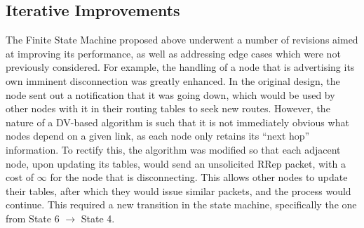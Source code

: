 \subsection{Iterative Improvements}\label{subsec:SMiterativeImprovements}
The Finite State Machine proposed above underwent a number of revisions aimed at improving its performance, as well as addressing edge cases which were not previously considered. For example, the handling of a node that is advertising its own imminent disconnection was greatly enhanced. In the original design, the node sent out a notification that it was going down, which would be used by other nodes with it in their routing tables to seek new routes. However, the nature of a DV-based algorithm is such that it is not immediately obvious what nodes depend on a given link, as each node only retains its ``next hop'' information. To rectify this, the algorithm was modified so that each adjacent node, upon updating its tables, would send an unsolicited RRep packet, with a cost of $\infty$ for the node that is disconnecting. This allows other nodes to update their tables, after which they would issue similar packets, and the process would continue. This required a new transition in the state machine, specifically the one from State 6 $\rightarrow$ State 4.
